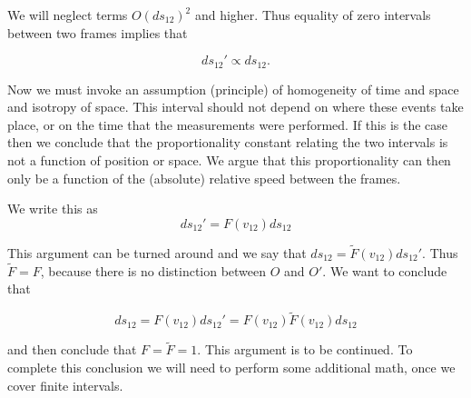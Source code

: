 We will neglect terms $O(ds_{12})^2$ and higher.  Thus equality of zero intervals between two frames implies that 

\begin{equation}\label{eqn:relativisticElectrodynamicsL2:80}
ds_{12}' \propto ds_{12}.
\end{equation}

Now we must invoke an assumption (principle) of homogeneity of time and space and isotropy of space.  This interval should not depend on where these events take place, or on the time that the measurements were performed.  If this is the case then we conclude that the proportionality constant relating the two intervals is not a function of position or space.  We argue that this proportionality can then only be a function of the (absolute) relative speed between the frames.

We write this as
\begin{equation}\label{eqn:relativisticElectrodynamicsL2:90}
ds_{12}' = F(v_{12}) ds_{12}
\end{equation}

This argument can be turned around and we say that $ds_{12} = \tilde{F}(v_{12}) ds_{12}'$.  Thus $\tilde{F} = F$, because there is no distinction between $O$ and $O'$.  We want to conclude that 

\begin{equation}\label{eqn:relativisticElectrodynamicsL2:100}
ds_{12} = F(v_{12}) ds_{12}' = F(v_{12}) \tilde{F}(v_{12}) ds_{12}
\end{equation}

and then conclude that $F = \tilde{F} = 1$.  This argument is to be continued.  To complete this conclusion we will need to perform some additional math, once we cover finite intervals.


\EndArticle
